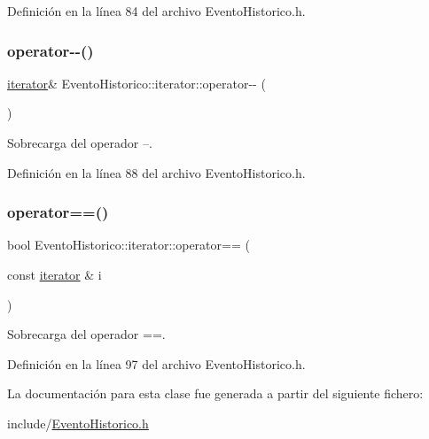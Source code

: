 Definición en la línea 84 del archivo Evento\+Historico.\+h.

\hypertarget{classEventoHistorico_1_1iterator_ada20b15309344487ed25239542608439}{}\label{classEventoHistorico_1_1iterator_ada20b15309344487ed25239542608439} 
\subsubsection{\texorpdfstring{operator-\/-\/()}{operator--()}}
{\footnotesize\ttfamily \hyperlink{classEventoHistorico_1_1iterator}{iterator}\& Evento\+Historico\+::iterator\+::operator-\/-\/ (\begin{DoxyParamCaption}{ }\end{DoxyParamCaption})\hspace{0.3cm}{\ttfamily [inline]}}



Sobrecarga del operador --. 



Definición en la línea 88 del archivo Evento\+Historico.\+h.

\hypertarget{classEventoHistorico_1_1iterator_ad1388fb2b648f289a2120416a6a922d0}{}\label{classEventoHistorico_1_1iterator_ad1388fb2b648f289a2120416a6a922d0} 
\subsubsection{\texorpdfstring{operator==()}{operator==()}}
{\footnotesize\ttfamily bool Evento\+Historico\+::iterator\+::operator== (\begin{DoxyParamCaption}\item[{const \hyperlink{classEventoHistorico_1_1iterator}{iterator} \&}]{i }\end{DoxyParamCaption})\hspace{0.3cm}{\ttfamily [inline]}}



Sobrecarga del operador ==. 



Definición en la línea 97 del archivo Evento\+Historico.\+h.



La documentación para esta clase fue generada a partir del siguiente fichero\+:\begin{DoxyCompactItemize}
\item 
include/\hyperlink{EventoHistorico_8h}{Evento\+Historico.\+h}\end{DoxyCompactItemize}
